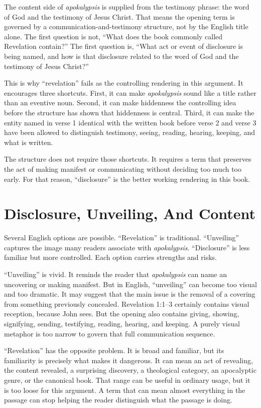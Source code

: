 The content side of \textit{apokalypsis} is supplied from the testimony phrase: the word of God and the testimony of Jesus Christ. That means the opening term is governed by a communication-and-testimony structure, not by the English title alone. The first question is not, ``What does the book commonly called Revelation contain?'' The first question is, ``What act or event of disclosure is being named, and how is that disclosure related to the word of God and the testimony of Jesus Christ?''

This is why ``revelation'' fails as the controlling rendering in this argument. It encourages three shortcuts. First, it can make \textit{apokalypsis} sound like a title rather than an eventive noun. Second, it can make hiddenness the controlling idea before the structure has shown that hiddenness is central. Third, it can make the entity named in verse 1 identical with the written book before verse 2 and verse 3 have been allowed to distinguish testimony, seeing, reading, hearing, keeping, and what is written.

The structure does not require those shortcuts. It requires a term that preserves the act of making manifest or communicating without deciding too much too early. For that reason, ``disclosure'' is the better working rendering in this book.

\section{Disclosure, Unveiling, And Content}

Several English options are possible. ``Revelation'' is traditional. ``Unveiling'' captures the image many readers associate with \textit{apokalypsis}. ``Disclosure'' is less familiar but more controlled. Each option carries strengths and risks.

``Unveiling'' is vivid. It reminds the reader that \textit{apokalypsis} can name an uncovering or making manifest. But in English, ``unveiling'' can become too visual and too dramatic. It may suggest that the main issue is the removal of a covering from something previously concealed. Revelation 1:1--3 certainly contains visual reception, because John sees. But the opening also contains giving, showing, signifying, sending, testifying, reading, hearing, and keeping. A purely visual metaphor is too narrow to govern that full communication sequence.

``Revelation'' has the opposite problem. It is broad and familiar, but its familiarity is precisely what makes it dangerous. It can mean an act of revealing, the content revealed, a surprising discovery, a theological category, an apocalyptic genre, or the canonical book. That range can be useful in ordinary usage, but it is too loose for this argument. A term that can mean almost everything in the passage can stop helping the reader distinguish what the passage is doing.

